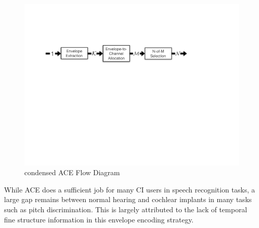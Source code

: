 \documentclass [11pt, proquest] {uwthesis}[2015/03/03]
\begin{document}
\begin{figure}[!ht]
  \centering
    \includegraphics[width=1\textwidth]{ACE_flow_diagram}   
    \caption{condensed ACE Flow Diagram}\label{fig:ace_flow_diagram}
\end{figure}

While ACE does a sufficient job for many CI users in speech recognition tasks, a large gap remains between normal hearing and cochlear implants in many tasks such as pitch discrimination.  This is largely attributed to the lack of temporal fine structure information in this envelope encoding strategy.



\end{document}
